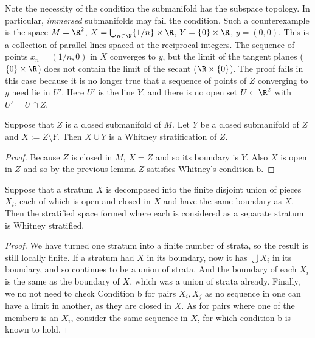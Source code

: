 Note the necessity of the condition the submanifold has the subspace topology. In particular, \emph{immersed} submanifolds may fail the condition. Such a counterexample is the space $M = \R^2$, $X = \bigcup_{n\in \N} \{1/n\} \times \R$, $Y = \{0\}\times \R$, $y=(0,0)$. This is a collection of parallel lines spaced at the reciprocal integers. The sequence of points $x_n = (1/n, 0)$ in $X$ converges to $y$, but the limit of the tangent planes ($\{0\}\times\R$) does not contain the limit of the secant ($ \R\times\{0\} $). The proof fails in this case because it is no longer true that a sequence of points of $Z$ converging to $y$ need lie in $U'$. Here $U'$ is the line $Y$, and there is no open set $U\subset \R^2$ with $U' = U \cap Z$.





\begin{lem}
    \label{lem:startified_pair}
Suppose that $Z$ is a closed submanifold of $M$. Let $Y$ be a closed submanifold of $Z$ and $X := Z \setminus Y$. Then $X\cup Y$ is a Whitney stratification of $Z$.

\begin{proof}
Because $Z$ is closed in $M$, $\overline{X} = Z$ and so its boundary is $Y$. Also $X$ is open in $Z$ and so by the previous lemma $Z$ satisfies Whitney's condition b.
\end{proof}
\end{lem}







\begin{lem}
    \label{lem:stratified_split}
Suppose that a stratum $X$ is decomposed into the finite disjoint union of pieces $X_i$, each of which is open and closed in $X$ and have the same boundary as $X$. Then the stratified space formed where each is considered as a separate stratum is Whitney stratified.

\begin{proof}
We have turned one stratum into a finite number of strata, so the result is still locally finite. If a stratum had $X$ in its boundary, now it has $\bigcup X_i$ in its boundary, and so continues to be a union of strata. And the boundary of each $X_i$ is the same as the boundary of $X$, which was a union of strata already. Finally, we no not need to check Condition b for pairs $X_i,X_j$ as no sequence in one can have a limit in another, as they are closed in $X$. As for pairs where one of the members is an $X_i$, consider the same sequence in $X$, for which condition b is known to hold.
\end{proof}
\end{lem}





